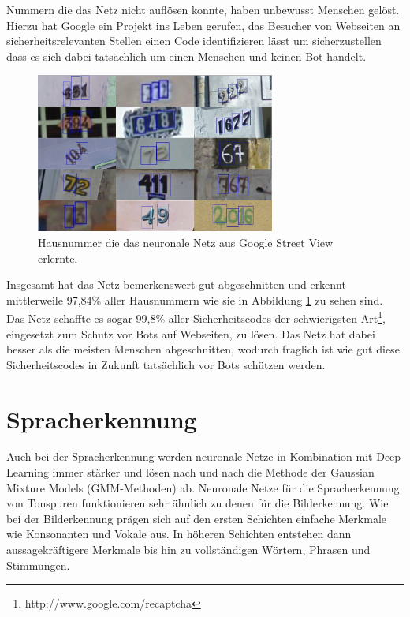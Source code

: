 Nummern die das Netz nicht auflösen konnte, haben unbewusst Menschen gelöst. Hierzu hat Google ein Projekt ins Leben gerufen, das Besucher von Webseiten an sicherheitsrelevanten Stellen einen Code identifizieren lässt um sicherzustellen dass es sich dabei tatsächlich um einen Menschen und keinen Bot handelt.

\begin{figure}
	\centering
	\includegraphics[width=0.7\textwidth]{images/streetview-numbers.png}
	\caption{Hausnummer die das neuronale Netz aus Google Street View erlernte.}
	\label{fig:streetview-numbers}
\end{figure}

Insgesamt hat das Netz bemerkenswert gut abgeschnitten \citep{numbercharts} und erkennt mittlerweile 97,84\% aller Hausnummern wie sie in Abbildung \ref{fig:streetview-numbers} zu sehen sind. Das Netz schaffte es sogar 99,8\% aller Sicherheitscodes der schwierigsten Art\footnote{http://www.google.com/recaptcha}, eingesetzt zum Schutz vor Bots auf Webseiten, zu lösen. Das Netz hat dabei besser als die meisten Menschen abgeschnitten, wodurch fraglich ist wie gut diese Sicherheitscodes in Zukunft tatsächlich vor Bots schützen werden.

\section{Spracherkennung}

Auch bei der Spracherkennung werden neuronale Netze in Kombination mit Deep Learning immer stärker und lösen nach und nach die Methode der Gaussian Mixture Models (GMM-Methoden) ab. Neuronale Netze für die Spracherkennung von Tonspuren funktionieren sehr ähnlich zu denen für die Bilderkennung. Wie bei der Bilderkennung prägen sich auf den ersten Schichten einfache Merkmale wie Konsonanten und Vokale aus. In höheren Schichten entstehen dann aussagekräftigere Merkmale bis hin zu vollständigen Wörtern, Phrasen und Stimmungen. 

